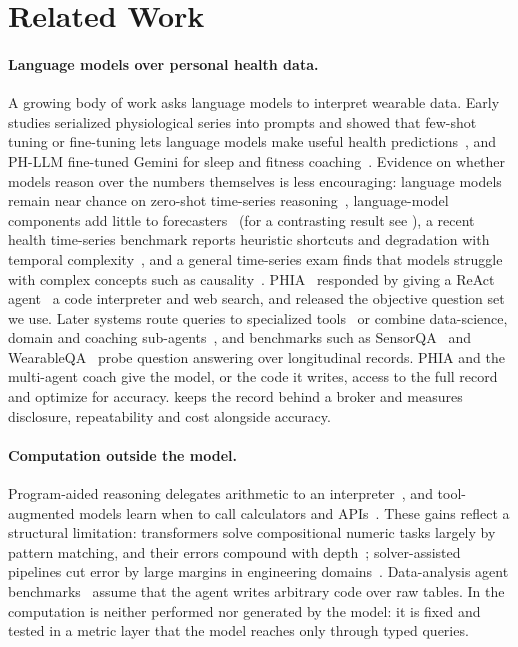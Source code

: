 \section{Related Work}\label{sec:related}

\paragraph{Language models over personal health data.} A growing body of work asks language models to interpret
wearable data. Early studies serialized physiological series into prompts and showed that few-shot tuning or
fine-tuning lets language models make useful health predictions~\citep{liu2023fewshot,kim2024healthllm}, and PH-LLM
fine-tuned Gemini for sleep and fitness coaching~\citep{cosentino2024phllm}. Evidence on whether models reason over
the numbers themselves is less encouraging: language models remain near chance on zero-shot time-series
reasoning~\citep{merrill2024timeseries}, language-model components add little to
forecasters~\citep{tan2024forecasting} (for a contrasting result see \citealp{jin2024timellm}), a recent health time-series benchmark reports heuristic shortcuts and degradation with temporal
complexity~\citep{li2026hearts}, and a general time-series exam finds that models struggle with complex concepts
such as causality~\citep{cai2024timeseriesexam}.
PHIA~\citep{merrill2024phia} responded by giving a ReAct agent~\citep{yao2023react} a code interpreter and web
search, and released the objective question set we use. Later systems route queries to specialized
tools~\citep{zhang2026weqa} or combine data-science, domain and coaching sub-agents~\citep{heydari2025anatomy}, and
benchmarks such as SensorQA~\citep{reichman2025sensorqa} and WearableQA~\citep{lee2026wearableqa} probe question
answering over longitudinal records. PHIA and the multi-agent coach give the model, or the code it writes, access to the
full record and optimize for accuracy. \sys{} keeps the record behind a broker and measures disclosure, repeatability and
cost alongside accuracy.

\paragraph{Computation outside the model.} Program-aided reasoning delegates arithmetic to an
interpreter~\citep{gao2022pal,chen2023pot,li2024chaincode}, and tool-augmented models learn when to call
calculators and APIs~\citep{schick2023toolformer}. These gains reflect a structural limitation: transformers solve
compositional numeric tasks largely by pattern matching, and their errors compound with
depth~\citep{dziri2023faith}; solver-assisted pipelines cut error by large margins in engineering
domains~\citep{kodathala2026equations}. Data-analysis agent benchmarks~\citep{hu2024dabench} assume that the agent
writes arbitrary code over raw tables. In \sys{} the computation is neither performed nor generated by the model: it
is fixed and tested in a metric layer that the model reaches only through typed queries.

